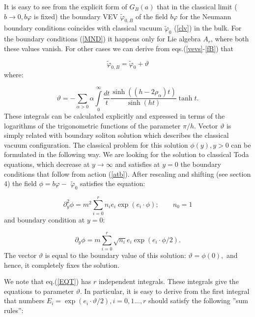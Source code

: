 \documentclass[a4paper,12pt]{article}
\begin{document}
It is easy to see from the explicit form of $G_B(a)$ that in the classical
limit ($b\rightarrow 0,b\varphi $ is fixed) the boundary VEV 
$\widetilde{\varphi }_{0,B}$ of the field $b\varphi $ for the Neumann boundary
conditions coincides with 
classical vacuum $\widetilde{\varphi }_0$ (\ref{clv}) in the bulk. 
For the boundary conditions
(\ref{MND}) it happens only for Lie algebra $A_r$, where both these values
vanish. For other cases we can derive from eqs.(\ref{vevs}-\ref{fB}) that

\begin{equation}
\widetilde{\varphi }_{0,B}=\widetilde{\varphi }_0+\vartheta  \label{TET}
\end{equation}
where:

\begin{equation}
\vartheta =-\sum\limits_{\alpha >0}\alpha \int\limits_0^\infty \frac{dt}t
\frac{\sinh ((h-2\rho
_\alpha )t)}{\sinh (ht)}\tanh t.  \label{TT}
\end{equation}
These integrals can be calculated explicitly and expressed in terms of the
logarithms of the trigonometric functions of the parameter $\pi /h$. 
Vector $\vartheta $ is simply related with boundary soliton solution which
describes the classical vacuum configuration. The classical problem for this
solution $\phi (y),y>0$ can be formulated in the following way. We are
looking for the solution to classical Toda equations, which decrease at $
y\rightarrow \infty $ and satisfies at $y=0$ the boundary conditions that
follow from action (\ref{atb}). After rescaling and shifting (see section 4)
the field $\phi =b\varphi -$ $\widetilde{\varphi }_0$ satisfies the equation:

\begin{equation}
\partial _y^2\phi =m^2\sum_{i=0}^rn_ie_i\exp (e_i\cdot \phi );\qquad n_0=1
\label{EQT}
\end{equation}
and boundary condition at $y=0$:

\begin{equation}
\partial _y\phi =m\sum\limits_{i=0}^r\sqrt{n_i}e_i\exp (e_i\cdot \phi /2).
\label{YN}
\end{equation}
The vector $\vartheta $ is equal to the boundary value of this solution: 
$\vartheta =\phi (0),$ and hence, it completely fixes the solution.

We note that eq.(\ref{EQT}) has $r$ independent integrals. 
These integrals give the
equations to parameter $\vartheta $. In particular, it is easy to derive from
the first integral that numbers $E_i=\exp (e_i\cdot\vartheta /2),i=0,1...,r$ 
should satisfy the following ''sum rules'':
\end{document}
